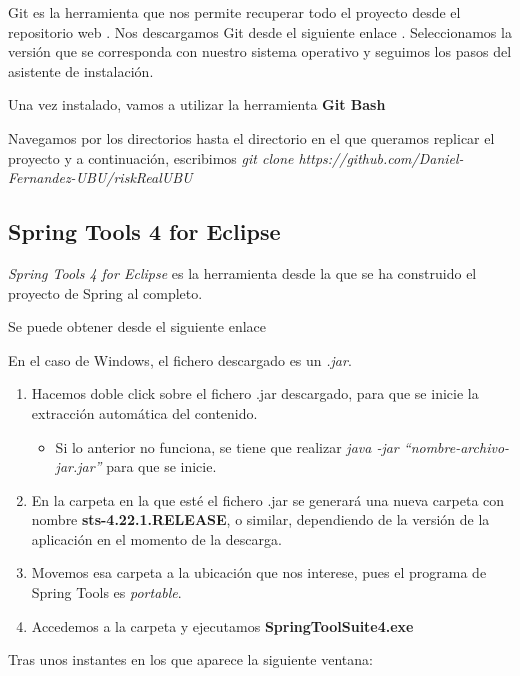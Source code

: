 Git es la herramienta que nos permite recuperar todo el proyecto desde el repositorio web \cite{github:proyect}. 
Nos descargamos Git desde el siguiente enlace \cite{web:git}.
Seleccionamos la versión que se corresponda con nuestro sistema operativo y seguimos los pasos del asistente de instalación.

Una vez instalado, vamos a utilizar la herramienta \textbf{Git Bash}

Navegamos por los directorios hasta el directorio en el que queramos replicar el proyecto y a continuación, escribimos \textit{git clone https://github.com/Daniel-Fernandez-UBU/riskRealUBU}

\subsection{Spring Tools 4 for Eclipse}

\textit{Spring Tools 4 for Eclipse} es la herramienta desde la que se ha construido el proyecto de Spring al completo. 

Se puede obtener desde el siguiente enlace \cite{web:springtoolssuite}

En el caso de Windows, el fichero descargado es un \textit{.jar}. 

\begin{enumerate}
	\item Hacemos doble click sobre el fichero .jar descargado, para que se inicie la extracción automática del contenido.
	\begin{itemize}
		\item Si lo anterior no funciona, se tiene que realizar \textit{java -jar ``nombre-archivo-jar.jar''} para que se inicie.
	\end{itemize}
	\item En la carpeta en la que esté el fichero .jar se generará una nueva carpeta con nombre \textbf{sts-4.22.1.RELEASE}, o similar, dependiendo de la versión de la aplicación en el momento de la descarga.
	\item Movemos esa carpeta a la ubicación que nos interese, pues el programa de Spring Tools es \textit{portable}.
	\item Accedemos a la carpeta y ejecutamos \textbf{SpringToolSuite4.exe}
\end{enumerate}

Tras unos instantes en los que aparece la siguiente ventana:

